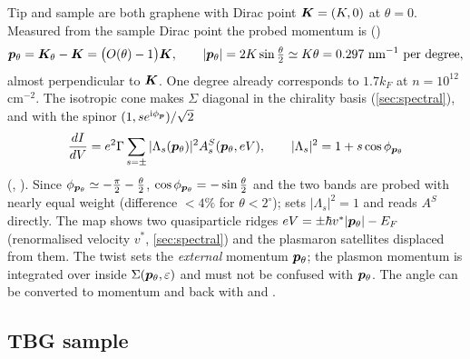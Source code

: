 Tip and sample are both graphene with Dirac point $\bm K=(K,0)$ at $\theta=0$. Measured from the sample Dirac
point the probed momentum is ()
\begin{equation}
\bm p_\theta=\bm K_\theta-\bm K=\bigl(O(\theta)-1\bigr)\bm K,\qquad |\bm p_\theta|=2K\sin\tfrac{\theta}{2}\simeq K\theta
=0.297\ \text{nm}^{-1}\ \text{per degree},
\label{eq:ptheta}
\end{equation}
almost perpendicular to $\bm K$. One degree already corresponds to $1.7k_F$ at $n=10^{12}$ cm$^{-2}$. The isotropic
cone makes $\Sigma$ diagonal in the chirality basis (\cref{sec:spectral}), and with the spinor $(1,se^{\mathrm i\phi_{\bm p}})/\sqrt2$
\begin{equation}
\frac{dI}{dV}=e^2\Gamma\sum_{s=\pm}|\Lambda_s(\bm p_\theta)|^2A^S_s(\bm p_\theta,eV),\qquad
|\Lambda_s|^2=1+s\cos\phi_{\bm p_\theta}
\label{eq:didvslg}
\end{equation}
(, ). Since $\phi_{\bm p_\theta}\simeq-\frac{\pi}{2}-\frac{\theta}{2}$,
$\cos\phi_{\bm p_\theta}=-\sin\frac\theta2$ and the two bands are probed with nearly equal weight (difference
$<4\%$ for $\theta<2^\circ$);  sets $|\Lambda_s|^2=1$ and reads $A^S$ directly.
The map shows two quasiparticle ridges $eV=\pm\hbar v^*|\bm p_\theta|-E_F$ (renormalised velocity $v^*$, \cref{sec:spectral})
and the plasmaron satellites displaced from them. The twist sets the \emph{external} momentum $\bm p_\theta$; the
plasmon momentum is integrated over inside $\Sigma(\bm p_\theta,\varepsilon)$ and must not be confused with $\bm p_\theta$.
The angle can be converted to momentum and back with  and .

\subsection{TBG sample}
\label{sec:qtmtbg}

